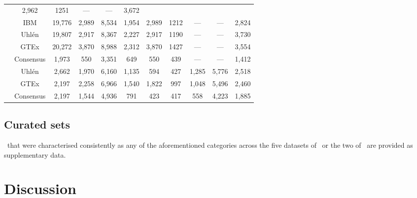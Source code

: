 \begin{landscape}
\begin{table}[]
\begin{tabular}{@{}ccccccccccc@{}}
& 2,962  & 1251 & --- & --- & 3,672  \\
& IBM & 19,776  & 2,989 & 8,534 & 1,954 &
2,989  & 1212  & --- & --- & 2,824  \\
& Uhlén & 19,807 & 2,917 & 8,367 & 2,227 &
2,917  & 1190  & --- & --- & 3,730  \\
& GTEx & 20,272 & 3,870 & 8,988  & 2,312 &
3,870  & 1427  & --- & --- & 3,554  \\
\cmidrule(l){2-11}
& Consensus & 1,973 & 550 & 3,351 & 649 &
550  & 439 & --- & --- & 1,412  \\
\midrule
\multirow{3}{*}{\rotatebox[origin=c]{90}{\parbox[c]{1.7cm}{\centering Common\\ 23
tissues\\ Working datasets}}} & Uhlén & 2,662  & 1,970  &
6,160 & 1,135 & 594  & 427 & 1,285 &
5,776 & 2,518 \\
& GTEx & 2,197 & 2,258 & 6,966  & 1,540 &
1,822  & 997 & 1,048 & 5,496  & 2,460 \\
\cmidrule(l){2-11}
& Consensus & 2,197 & 1,544 & 4,936 & 791 &
423 & 417 & 558 & 4,223 & 1,885 \\
\bottomrule
\end{tabular}
\end{table}
\end{landscape}
\pagestyle{scrheadings}


\subsection{Curated sets}\label{subsec:Trans_curatedSets}
\Pcgs\ that were characterised consistently
as any of the aforementioned categories across the five datasets of \setOne\
or the two of \setTwo\
are provided as supplementary data.


\section{Discussion}\label{sec:Trans_discussion}

